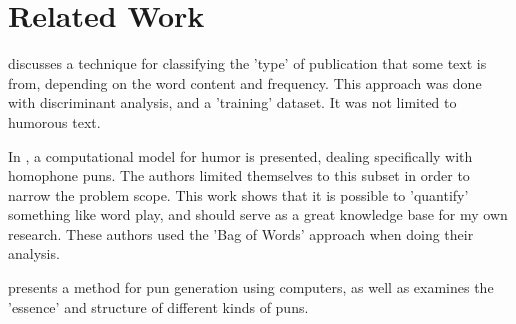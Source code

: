 \section{Related Work}

\cite{Stamatatos:2000:TGD:992730.992763} discusses a technique for classifying the 'type' of publication that some text is from, depending on the word content and frequency. This approach was done with discriminant analysis, and a 'training' dataset. It was not limited to humorous text.

In \cite{kaofunny}, a computational model for humor is presented, dealing specifically with homophone puns. The authors limited themselves to this subset in order to narrow the problem scope. This work shows that it is possible to 'quantify' something like word play, and should serve as a great knowledge base for my own research. These authors used the 'Bag of Words' approach when doing their analysis.

\cite{ritchie2005computational} presents a method for pun generation using computers, as well as examines the 'essence' and structure of different kinds of puns.

